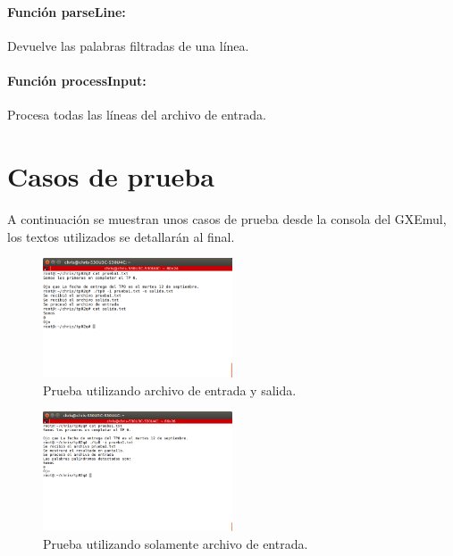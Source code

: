 \documentclass[a4paper]{article}
\begin{document}
\paragraph{Función parseLine:}
Devuelve las palabras filtradas de una línea.

\paragraph{Función processInput:}
Procesa todas las líneas del archivo de entrada.

\section{Casos de prueba}

A continuación se muestran unos casos de prueba desde la consola del GXEmul, los textos utilizados se detallarán al final.


\begin{figure}[!htp]
\begin{center}
\includegraphics[width=0.5\textwidth]{prueba1.png}
\caption{Prueba utilizando archivo de entrada y salida.} \label{fig001}
\end{center}
\end{figure}

\begin{figure}[!htp]
\begin{center}
\includegraphics[width=0.5\textwidth]{prueba1SalidaPorPantalla.png}
\caption{Prueba utilizando solamente archivo de entrada.} \label{fig001}
\end{center}
\end{figure}
\end{document}
